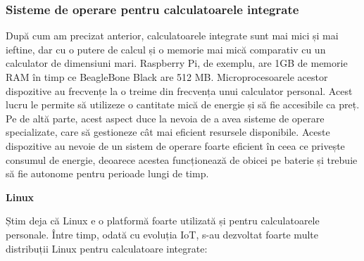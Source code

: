 \subsubsection{Sisteme de operare pentru calculatoarele integrate}
\label{sec:embed:micro-comp:embed:os}

După cum am precizat anterior, calculatoarele integrate sunt mai mici și mai
ieftine, dar cu o putere de calcul și o memorie mai mică comparativ cu un
calculator de dimensiuni mari. Raspberry Pi, de exemplu, are 1GB de memorie RAM
în timp ce BeagleBone Black are 512 MB. Microprocesoarele acestor dispozitive au
frecvențe la o treime din frecvența unui calculator personal. Acest lucru le
permite să utilizeze o cantitate mică de energie și să fie accesibile ca preț.
Pe de altă parte, acest aspect duce la nevoia de a avea sisteme de operare
specializate, care să gestioneze cât mai eficient resursele disponibile. Aceste
dispozitive au nevoie de un sistem de operare foarte eficient în ceea ce
privește consumul de energie, deoarece acestea funcționează de obicei pe baterie
și trebuie să fie autonome pentru perioade lungi de timp.

\textbf{Linux}

Știm deja că Linux e o platformă foarte utilizată și pentru calculatoarele
personale. Între timp, odată cu evoluția IoT, s-au dezvoltat foarte multe
distribuții Linux pentru calculatoare integrate:

